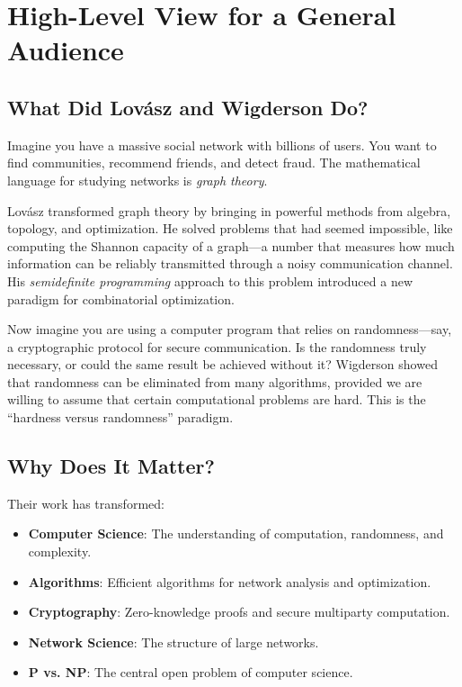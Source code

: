 \section{High-Level View for a General Audience}

\subsection{What Did Lov\'asz and Wigderson Do?}

Imagine you have a massive social network with billions of users. You want to find communities, recommend friends, and detect fraud. The mathematical language for studying networks is \emph{graph theory}.

Lov\'asz transformed graph theory by bringing in powerful methods from algebra, topology, and optimization. He solved problems that had seemed impossible, like computing the Shannon capacity of a graph---a number that measures how much information can be reliably transmitted through a noisy communication channel. His \emph{semidefinite programming} approach to this problem introduced a new paradigm for combinatorial optimization.

Now imagine you are using a computer program that relies on randomness---say, a cryptographic protocol for secure communication. Is the randomness truly necessary, or could the same result be achieved without it? Wigderson showed that randomness can be eliminated from many algorithms, provided we are willing to assume that certain computational problems are hard. This is the ``hardness versus randomness'' paradigm.

\subsection{Why Does It Matter?}

Their work has transformed:
\begin{itemize}
\item \textbf{Computer Science}: The understanding of computation, randomness, and complexity.
\item \textbf{Algorithms}: Efficient algorithms for network analysis and optimization.
\item \textbf{Cryptography}: Zero-knowledge proofs and secure multiparty computation.
\item \textbf{Network Science}: The structure of large networks.
\item \textbf{P vs. NP}: The central open problem of computer science.
\end{itemize}

